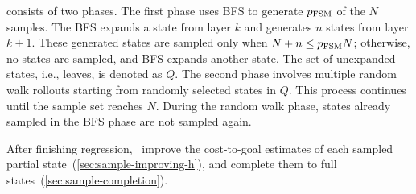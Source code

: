 \documentclass[ppgc,diss,english]{iiufrgs}
\begin{document}
\bfsrw consists of two phases. The first phase uses BFS to generate $p_\text{FSM}$ of the $N$ samples. The BFS expands a state from layer $k$ and generates $n$ states from layer $k+1$. These generated states are sampled only when $N + n \leq p_{\text{FSM}}N$; otherwise, no states are sampled, and BFS expands another state. The set of unexpanded states, i.e., leaves, is denoted as $Q$. The second phase involves multiple random walk rollouts starting from randomly selected states in $Q$. This process continues until the sample set reaches $N$. During the random walk phase, states already sampled in the BFS phase are not sampled again.

After finishing regression,~\citet{Bettker.etal/2022} improve the cost-to-goal estimates of each sampled partial state~(\cref{sec:sample-improving-h}), and complete them to full states~(\cref{sec:sample-completion}).

%
\end{document}
